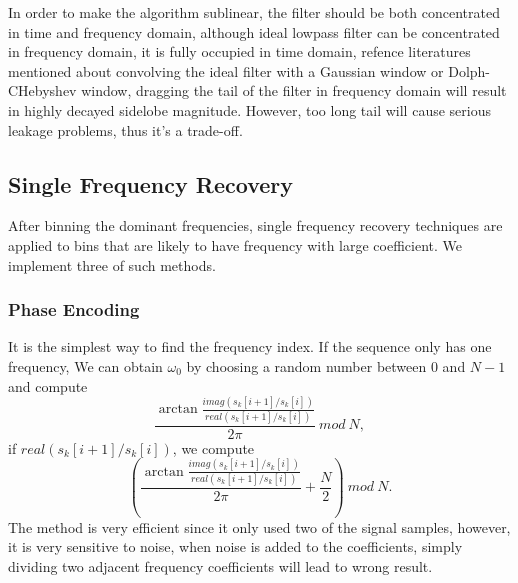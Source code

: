\documentclass[journal,transmag]{IEEEtran}
\begin{document}
In order to make the algorithm sublinear, the filter should be both concentrated in time and frequency domain, although ideal lowpass filter can be concentrated in frequency domain, it is fully occupied in time domain, refence literatures mentioned about convolving the ideal filter with a Gaussian window or Dolph-CHebyshev window\cite{hassanieh2012simple}, dragging the tail of the filter in frequency domain will result in highly decayed sidelobe magnitude. However, too long tail will cause serious leakage problems, thus it's a trade-off.

\subsection{Single Frequency Recovery}
After binning the dominant frequencies, single frequency recovery techniques are applied to bins that are likely to have frequency with large coefficient. We implement three of such methods.
\subsubsection{Phase Encoding}

It is the simplest way to find the frequency index. If the sequence only has one frequency, We can obtain $\omega_0$ by choosing a random number between 0 and $N-1$ and compute
\begin{equation}
	\frac{\arctan \frac{imag(s_k[i+1]/s_k[i])}{real(s_k[i+1]/s_k[i])}}{2\pi}\: mod \: N,
\end{equation}
if $real(s_k[i+1]/s_k[i])$, we compute
\begin{equation}
	(\frac{\arctan \frac{imag(s_k[i+1]/s_k[i])}{real(s_k[i+1]/s_k[i])}}{2\pi}+\frac{N}{2})\: mod \: N. 
\end{equation}
The method is very efficient since it only used two of the signal samples, however, it is very sensitive to noise, when noise is added to the coefficients, simply dividing two adjacent frequency coefficients will lead to wrong result.
\end{document}
